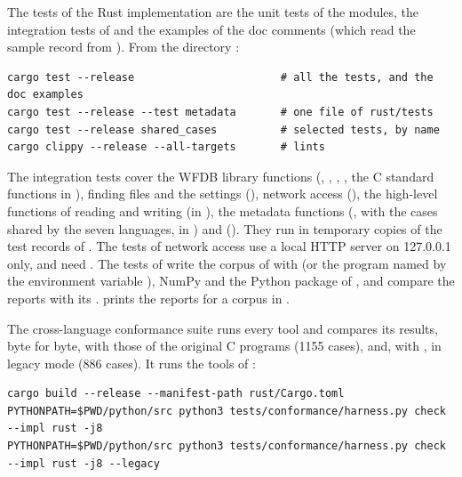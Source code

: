 The tests of the Rust implementation are the unit tests of the modules, the integration
tests of  and the examples of the doc comments (which read the sample
record  from ). From the directory :

\begin{lstlisting}[style=shell]
cargo test --release                       # all the tests, and the doc examples
cargo test --release --test metadata       # one file of rust/tests
cargo test --release shared_cases          # selected tests, by name
cargo clippy --release --all-targets       # lints
\end{lstlisting}

The integration tests cover the WFDB library functions (,
, , , the C standard functions in
), finding files and the settings (), network access
(), the high-level functions of reading and writing (in
), the metadata functions (,
with the cases shared by the seven languages, in ) and
 (). They run in temporary copies of the test records
of . The tests of network access use a local HTTP server on 127.0.0.1
only, and need . The tests of  write the corpus of
 with  (or the program named by the
environment variable ), NumPy and the Python package of ,
and compare the reports with its .
 prints the reports for a corpus in
.

The cross-language conformance suite runs every tool and compares its results, byte for
byte, with those of the original C programs (1155 cases), and, with , in
legacy mode (886 cases). It runs the tools of :

\begin{lstlisting}[style=shell]
cargo build --release --manifest-path rust/Cargo.toml
PYTHONPATH=$PWD/python/src python3 tests/conformance/harness.py check --impl rust -j8
PYTHONPATH=$PWD/python/src python3 tests/conformance/harness.py check --impl rust -j8 --legacy
\end{lstlisting}
